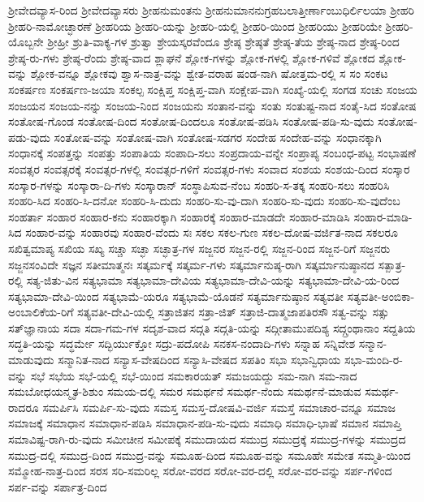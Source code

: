 ಶ್ರೀವೇದವ್ಯಾಸ-ರಿಂದ
ಶ್ರೀವೇದವ್ಯಾಸರು
ಶ್ರೀಹನುಮಂತನು
ಶ್ರೀಹನುಮಾನನುಗ್ರಹಬಲಾತ್ತೀರ್ಣಾಂಬುಧಿರ್ಲಿಲಯಾ
ಶ್ರೀಹರಿ
ಶ್ರೀಹರಿ-ನಾಮೋಚ್ಛಾರಣೆ
ಶ್ರೀಹರಿಯ
ಶ್ರೀಹರಿ-ಯನ್ನು
ಶ್ರೀಹರಿ-ಯಲ್ಲಿ
ಶ್ರೀಹರಿ-ಯಿಂದ
ಶ್ರೀಹರಿಯು
ಶ್ರೀಹರಿಯೇ
ಶ್ರೀಹರಿ-ಯೊಬ್ಬನೇ
ಶ್ರೀಹ್ರೀ
ಶ್ರುತಿ-ವಾಕ್ಯ-ಗಳ
ಶ್ರುತ್ವಾ
ಶ್ರೇಯಸ್ಕರವೆಂದೂ
ಶ್ರೇಷ್ಠ
ಶ್ರೇಷ್ಠತೆ
ಶ್ರೇಷ್ಠ-ತೆಯ
ಶ್ರೇಷ್ಠ-ನಾದ
ಶ್ರೇಷ್ಠ-ರಿಂದ
ಶ್ರೇಷ್ಠ-ರು-ಗಳು
ಶ್ರೇಷ್ಠ-ರೆಂದು
ಶ್ರೇಷ್ಠ-ವಾದ
ಶ್ಲಾಘನೆ
ಶ್ಲೋಕ-ಗಳನ್ನು
ಶ್ಲೋಕ-ಗಳಲ್ಲಿ
ಶ್ಲೋಕ-ಗಳಿವೆ
ಶ್ಲೋಕದ
ಶ್ಲೋಕ-ವನ್ನು
ಶ್ಲೋಕ-ವನ್ನೂ
ಶ್ಲೋಕವು
ಶ್ವಾಸ-ನಾತ್ರ-ವನ್ನು
ಶ್ವೇತ-ವರಾಹ
ಷಂಡ-ನಾಗಿ
ಷೋತ್ತಮ-ರಲ್ಲಿ
ಸ
ಸಂ
ಸಂಕಟ
ಸಂಕರ್ಷಣ
ಸಂಕರ್ಷಣ-ಜಯಾ
ಸಂಕಲ್ಪ
ಸಂಕ್ಷಿಪ್ತ
ಸಂಕ್ಷಿಪ್ತ-ವಾಗಿ
ಸಂಕ್ಷೇಪ-ವಾಗಿ
ಸಂಖ್ಯೆ-ಯಲ್ಲಿ
ಸಂಗಡ
ಸಂಚು
ಸಂಜಯ
ಸಂಜಯನ
ಸಂಜಯ-ನನ್ನು
ಸಂಜಯ-ನಿಂದ
ಸಂಜಯನು
ಸಂತಾನ-ವನ್ನು
ಸಂತು
ಸಂತುಷ್ಟ-ನಾದ
ಸಂತೈ-ಸಿದ
ಸಂತೋಷ
ಸಂತೋಷ-ಗೊಂಡ
ಸಂತೋಷ-ದಿಂದ
ಸಂತೋಷ-ದಿಂದಲೂ
ಸಂತೋಷ-ಪಡಿಸಿ
ಸಂತೋಷ-ಪಡಿ-ಸು-ವುದು
ಸಂತೋಷ-ಪಡು-ವುದು
ಸಂತೋಷ-ವನ್ನು
ಸಂತೋಷ-ವಾಗಿ
ಸಂತೋಷ-ಸಡಗರ
ಸಂದೇಹ
ಸಂದೇಹ-ವನ್ನು
ಸಂಧಾನಕ್ಕಾಗಿ
ಸಂಧಾನಕ್ಕೆ
ಸಂಪತ್ತನ್ನು
ಸಂಪತ್ತು
ಸಂಪಾತಿಯ
ಸಂಪಾದಿ-ಸಲು
ಸಂಪ್ರದಾಯ-ವನ್ನೇ
ಸಂಪ್ರಾಪ್ಯ
ಸಂಬಂಧ-ಪಟ್ಟ
ಸಂಭಾಷಣೆ
ಸಂವತ್ಸರ
ಸಂವತ್ಸರಕ್ಕೆ
ಸಂವತ್ಸರ-ಗಳಲ್ಲಿ
ಸಂವತ್ಸರ-ಗಳಿಗೆ
ಸಂವತ್ಸರ-ಗಳು
ಸಂವಾದ
ಸಂಶಯ
ಸಂಶಯ-ದಿಂದ
ಸಂಸ್ಕಾರ
ಸಂಸ್ಕಾರ-ಗಳನ್ನು
ಸಂಸ್ಕಾರಾ-ದಿ-ಗಳು
ಸಂಸ್ಕಾರಾನ್
ಸಂಸ್ಥಾಪಿಸುವ-ನೆಂಬ
ಸಂಹರಿ-ಸ-ತಕ್ಕ
ಸಂಹರಿ-ಸಲು
ಸಂಹರಿಸಿ
ಸಂಹರಿ-ಸಿದ
ಸಂಹರಿ-ಸಿ-ದನೋ
ಸಂಹರಿ-ಸಿ-ದುದು
ಸಂಹರಿ-ಸು-ವು-ದಾಗಿ
ಸಂಹರಿ-ಸು-ವುದು
ಸಂಹರಿ-ಸು-ವುದೆಂಬ
ಸಂಹರ್ತಾ
ಸಂಹಾರ
ಸಂಹಾರ-ಕನು
ಸಂಹಾರಕ್ಕಾಗಿ
ಸಂಹಾರಕ್ಕೆ
ಸಂಹಾರ-ಮಾಡದೇ
ಸಂಹಾರ-ಮಾಡಿಸಿ
ಸಂಹಾರ-ಮಾಡಿ-ಸಿದ
ಸಂಹಾರ-ವನ್ನು
ಸಂಹಾರವು
ಸಂಹಾರ-ವೆಂದು
ಸಃ
ಸಕಲ
ಸಕಲ-ಗುಣ
ಸಕಲ-ದೋಷ-ವರ್ಜಿತ-ನಾದ
ಸಕಲರೂ
ಸಖಿತ್ವಮಾಪ್ಯ
ಸಖಿಯ
ಸಖ್ಯ
ಸಚ್ಚಾ
ಸಚ್ಛಾ
ಸಚ್ಛಾತ್ರ-ಗಳ
ಸಜ್ಜನರ
ಸಜ್ಜನ-ರಲ್ಲಿ
ಸಜ್ಜನ-ರಿಂದ
ಸಜ್ಜನ-ರಿಗೆ
ಸಜ್ಜನರು
ಸಜ್ಜನಸಂವಿದೇ
ಸಜ್ಞನ
ಸತೀಮಾತ್ಮನಃ
ಸತ್ಕರ್ಮಕ್ಕೆ
ಸತ್ಕರ್ಮ-ಗಳು
ಸತ್ಕರ್ಮಾನುಷ್ಠ-ರಾಗಿ
ಸತ್ಕರ್ಮಾನುಷ್ಠಾನದ
ಸತ್ಪಾತ್ರ-ರಲ್ಲಿ
ಸತ್ಯ-ಜಿತು-ವಿನ
ಸತ್ಯಭಾಮಾ
ಸತ್ಯಭಾಮಾ-ದೇವಿಯ
ಸತ್ಯಭಾಮಾ-ದೇವಿ-ಯನ್ನು
ಸತ್ಯಭಾಮಾ-ದೇವಿ-ಯ-ರಿಂದ
ಸತ್ಯಭಾಮಾ-ದೇವಿ-ಯಿಂದ
ಸತ್ಯಭಾಮೆ-ಯರೂ
ಸತ್ಯಭಾಮೆ-ಯೊಡನೆ
ಸತ್ಯರ್ಮಾನುಷ್ಠಾನ
ಸತ್ಯವತೀ
ಸತ್ಯವತೀ-ಅಂಬಿಕಾ-ಅಂಬಾಲಿಕೆಯ-ರಿಗೆ
ಸತ್ಯವತೀ-ದೇವಿ-ಯಲ್ಲಿ
ಸತ್ರಾಜಿತನ
ಸತ್ರಾ-ಜಿತ್
ಸತ್ರಾಜಿ-ದಾತ್ಮಜಾಪತಿರಸೌ
ಸತ್ವ-ವನ್ನು
ಸತ್ಸು
ಸತ್‌ಜ್ಞಾನಾಯ
ಸದಾ
ಸದಾ-ಗಮ-ಗಳ
ಸದೃಶ-ವಾದ
ಸದ್ಗತಿ
ಸದ್ಗತಿ-ಯನ್ನು
ಸದ್ಗೀತಾಮುಪದಿಶ್ಯ
ಸದ್ಗ್ರಂಥಾನಾಂ
ಸದ್ದತಿಯ
ಸದ್ಧತಿ-ಯನ್ನು
ಸದ್ಧರ್ಮೇ
ಸದ್ಭಿರ್ಯುಕ್ತೋ
ಸದ್ರು-ಪದೋಪಿ
ಸನಕಸ-ನಂದಾದಿ-ಗಳು
ಸನ್ನಾಹ
ಸನ್ನಿವೇಶ
ಸನ್ಮಾನ-ಮಾಡುವುದು
ಸನ್ಮಾನಿತ-ನಾದ
ಸನ್ಯಾಸ-ವೇಷದಿಂದ
ಸನ್ಯಾಸಿ-ವೇಷದ
ಸಪತಿಂ
ಸಭಾ
ಸಭಾನ್ವಿಧಾಯ
ಸಭಾ-ಮಂದಿ-ರ-ವನ್ನು
ಸಭೆ
ಸಭೆಯ
ಸಭೆ-ಯಲ್ಲಿ
ಸಭೆ-ಯಿಂದ
ಸಮಕಾರಯತ್‌
ಸಮಜಯದ್ದು
ಸಮ-ನಾಗಿ
ಸಮ-ನಾದ
ಸಮಬೋಧಯನ್ಮೃತ-ಶಿಶುಂ
ಸಮಯ-ದಲ್ಲಿ
ಸಮರ
ಸಮರ್ಥನೆ
ಸಮರ್ಥ-ನೆಂದು
ಸಮರ್ಥನೆ-ಮಾಡುವ
ಸಮರ್ಥ-ರಾದರೂ
ಸಮರ್ಪಿಸಿ
ಸಮರ್ಪಿ-ಸು-ವುದು
ಸಮಸ್ತ
ಸಮಸ್ತ-ದೋಷವಿ-ವರ್ಜಿ
ಸಮಸ್ತೆ
ಸಮಾಚಾರ-ವನ್ನೂ
ಸಮಾಜ
ಸಮಾಜಕ್ಕೆ
ಸಮಾಧಾನ
ಸಮಾಧಾನ-ಪಡಿಸಿ
ಸಮಾಧಾನ-ಪಡಿ-ಸು-ವುದು
ಸಮಾಧಿ
ಸಮಾಧಿ-ಭಾಷೆ
ಸಮಾನ
ಸಮಾಪ್ತಿ
ಸಮಾವಿಷ್ಟ-ರಾಗಿ-ರು-ವುದು
ಸಮೀಚೀನ
ಸಮೀಪಕ್ಕೆ
ಸಮುದಾಯದ
ಸಮುದ್ರ
ಸಮುದ್ರಕ್ಕೆ
ಸಮುದ್ರ-ಗಳನ್ನು
ಸಮುದ್ರದ
ಸಮುದ್ರ-ದಲ್ಲಿ
ಸಮುದ್ರ-ದಿಂದ
ಸಮುದ್ರ-ವನ್ನು
ಸಮೂಹ-ದಿಂದ
ಸಮೂಹ-ವನ್ನು
ಸಮೂಹೇ
ಸಮೇತ
ಸಮ್ಮತಿ-ಯಿಂದ
ಸಮ್ಮೋಹ-ನಾತ್ರ-ದಿಂದ
ಸರಸ
ಸರಿ-ಸಮರಿಲ್ಲ
ಸರೋ-ವರದ
ಸರೋ-ವರ-ದಲ್ಲಿ
ಸರೋ-ವರ-ವನ್ನು
ಸರ್ಪ-ಗಳಿಂದ
ಸರ್ಪ-ವನ್ನು
ಸರ್ಪಾತ್ರ-ದಿಂದ
